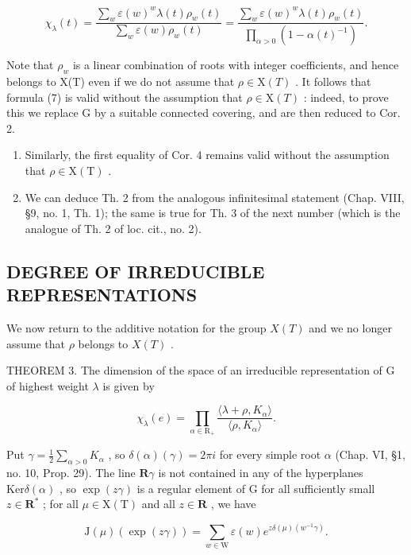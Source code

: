 \[
\chi_ {\lambda} (t) = \frac {\sum_ {w} \varepsilon (w) ^ {w} \lambda (t) \rho_ {w} (t)}{\sum_ {w} \varepsilon (w) \rho_ {w} (t)} = \frac {\sum_ {w} \varepsilon (w) ^ {w} \lambda (t) \rho_ {w} (t)}{\prod_ {\alpha > 0} (1 - \alpha (t) ^ {- 1})}.\tag{7}
\]

Note that \(\rho_{w}\) is a linear combination of roots with integer coefficients, and hence belongs to X(T) even if we do not assume that \(\rho \in \mathrm{X}(T)\) . It follows that formula (7) is valid without the assumption that \(\rho \in \mathrm{X}(T)\) : indeed, to prove this we replace G by a suitable connected covering, and are then reduced to Cor. 2.

\begin{enumerate}
\def\labelenumi{\arabic{enumi})}
\setcounter{enumi}{1}
\item
  Similarly, the first equality of Cor. 4 remains valid without the assumption that \(\rho \in \mathrm{X}(\mathrm{T})\) .
\item
  We can deduce Th. 2 from the analogous infinitesimal statement (Chap. VIII, §9, no. 1, Th. 1); the same is true for Th. 3 of the next number (which is the analogue of Th. 2 of loc. cit., no. 2).
\end{enumerate}

\subsection{DEGREE OF IRREDUCIBLE REPRESENTATIONS}

We now return to the additive notation for the group \(X(T)\) and we no longer assume that \(\rho\) belongs to \(X(T)\) .

THEOREM 3. The dimension of the space of an irreducible representation of G of highest weight \(\lambda\) is given by

\[
\chi_ {\lambda} (e) = \prod_ {\alpha \in \mathrm{R} _ {+}} \frac {\langle \lambda + \rho , K _ {\alpha} \rangle}{\langle \rho , K _ {\alpha} \rangle}.
\]

Put \(\gamma = \frac{1}{2}\sum_{\alpha >0}K_{\alpha}\) , so \(\delta (\alpha)(\gamma) = 2\pi i\) for every simple root \(\alpha\) (Chap. VI, §1, no. 10, Prop. 29). The line \(\mathbf{R}\gamma\) is not contained in any of the hyperplanes \(\mathrm{Ker}\delta (\alpha)\) , so \(\exp (z\gamma)\) is a regular element of G for all sufficiently small \(z\in \mathbf{R}^*\) ; for all \(\mu \in \mathrm{X(T)}\) and all \(z\in \mathbf{R}\) , we have

\[
\mathrm{J} (\mu) (\exp (z \gamma)) = \sum_ {w \in \mathrm{W}} \varepsilon (w) e ^ {z \delta (\mu) (w ^ {- 1} \gamma)}.
\]

